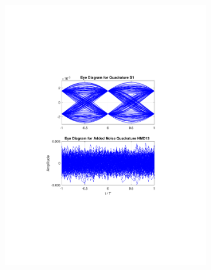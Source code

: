 \begin{refsection}
\begin{figure}[H]
\begin{minipage}{\linewidth}
\begin{subfigure}{.45\textwidth}
		\includegraphics[clip, trim=5cm 7cm 5cm 7cm, width=\textwidth]{./sdf/m_qam_system/figures/eyes/q_n_nmf_60_60_rc_03.pdf}
	\end{subfigure}
	

\end{minipage}
\end{figure}
\end{refsection}
